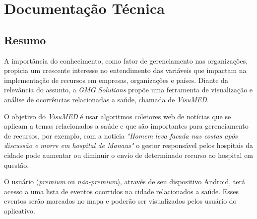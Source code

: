 \documentclass[
	12pt,				%
	openright,			%
	twoside,			%
	a4paper,			%
	english,			%
	french,				%
	spanish,			%
	brazil,				%
	]{abntex2}
\begin{document}

\frenchspacing 


\imprimircapa

\imprimirfolhaderosto*

\setlength{\absparsep}{18pt} %


\tableofcontents*
\cleardoublepage

\part{Documentação Técnica}


\chapter{Resumo}

A importância do conhecimento, como fator de gerenciamento nas organizações, propicia um crescente interesse no entendimento das variáveis que impactam na implementação de recursos em empresas, organizações e países. Diante da relevância do assunto, a \textit{GMG Solutions} propõe uma ferramenta de visualização e análise de ocorrências relacionadas a saúde, chamada de \textit{VisuMED}. 

O objetivo do \textit{VisuMED} é  usar algoritmos coletores web de notícias que se aplicam a temas relacionados a saúde e que são importantes para gerenciamento de recursos, por exemplo, com a noticia \textit{"Homem leva facada nas costas após discussão e morre em hospital de Manaus"} o gestor responsável pelos hospitais da cidade pode aumentar ou diminuir o envio de determinado recurso ao hospital em questão.

O usuário (\textit{premium} ou \textit{não-premium}), através de seu dispositivo Android, terá acesso a uma lista de eventos ocorridos na cidade relacionados a saúde. Esses eventos serão marcados no mapa e poderão ser visualizados pelos usuário do aplicativo.
\end{document}

